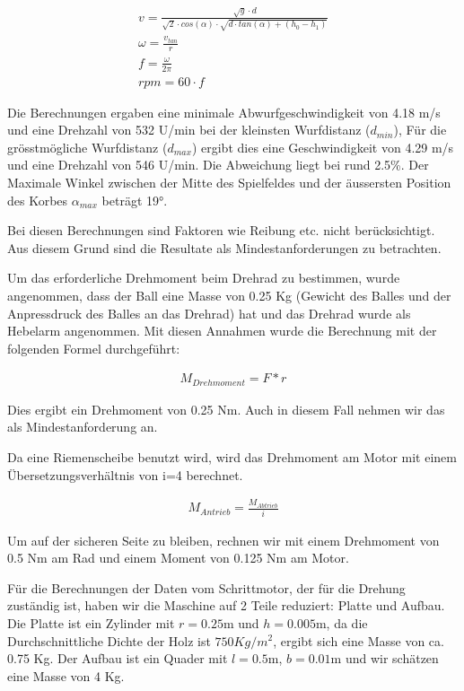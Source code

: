 \begin{gather}
	v=\frac{\sqrt{g} \cdot d}{\sqrt{2} \cdot cos(\alpha) \cdot \sqrt{d \cdot tan(\alpha)+(h_0-h_1)}}\\
	\omega=\frac{v_{tan}}{r}\\
	f=\frac{\omega}{2\pi}\\
	rpm=60 \cdot f
\end{gather}

Die Berechnungen ergaben eine minimale Abwurfgeschwindigkeit von 4.18 m/s und eine Drehzahl von 532 U/min bei der kleinsten Wurfdistanz ($d_{min}$), 
Für die grösstmögliche Wurfdistanz ($d_{max}$) ergibt dies eine Geschwindigkeit von 4.29 m/s und eine Drehzahl von 546 U/min. 
Die Abweichung liegt bei rund 2.5\%.
Der Maximale Winkel zwischen der Mitte des Spielfeldes und der äussersten Position des Korbes $\alpha_{max}$ beträgt 19°.

Bei diesen Berechnungen sind Faktoren wie Reibung etc. nicht berücksichtigt. Aus diesem Grund sind die Resultate als Mindestanforderungen zu betrachten.

Um das erforderliche Drehmoment beim Drehrad zu bestimmen, wurde angenommen, dass der Ball eine Masse von 0.25 Kg (Gewicht des Balles und der Anpressdruck des Balles an das Drehrad) hat und das Drehrad wurde als Hebelarm angenommen. Mit diesen Annahmen wurde die Berechnung mit der folgenden Formel durchgeführt:

\begin{gather}
	M_{Drehmoment}=F*r
\end{gather}

Dies ergibt ein Drehmoment von 0.25 Nm. Auch in diesem Fall nehmen wir das als Mindestanforderung an.

Da eine Riemenscheibe benutzt wird, wird das Drehmoment am Motor mit einem Übersetzungsverhältnis von i=4 berechnet.

\begin{gather}
	M_{Antrieb}=\frac{M_{Abtrieb}}{i}
\end{gather}

Um auf der sicheren Seite zu bleiben, rechnen wir mit einem Drehmoment von 0.5 Nm am Rad und einem Moment von 0.125 Nm am Motor.

Für die Berechnungen der Daten vom Schrittmotor, der für die Drehung zuständig ist, haben wir die Maschine auf 2 Teile reduziert: Platte und Aufbau.
Die Platte ist ein Zylinder mit $r=0.25$m und $h=0.005$m, da die Durchschnittliche Dichte der Holz ist $750 Kg/m^2$, ergibt sich eine Masse von ca. 0.75 Kg.
Der Aufbau ist ein Quader mit $l=0.5$m, $b=0.01$m und wir schätzen eine Masse von 4 Kg.

